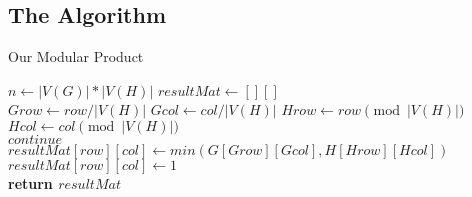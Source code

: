 \subsection{The Algorithm}
\begin{algorithm}
    \caption{Our Modular Product}\label{alg:modprod}
    \begin{algorithmic}
            \State $n \gets |V(G)| * |V(H)|$
            \State $resultMat \gets [][]$  \\
    
                    \State $Grow \gets row / |V(H)|$
                    \State $Gcol \gets col / |V(H)|$
                    \State $Hrow \gets row \pmod {|V(H)|}$
                    \State $Hcol \gets col \pmod {|V(H)|}$
                    \\
                        \State $continue$
                    \EndIf
                    \\
                    \State $resultMat[row][col] \gets min(G[Grow][Gcol], H[Hrow][Hcol])$
                    \\
                        \State $resultMat[row][col] \gets 1$
                    \EndIf
                \EndFor
            \EndFor
            \\
            \State \textbf{return $resultMat$}
            \\
        \EndProcedure
    \end{algorithmic}
\end{algorithm}

\newpage

